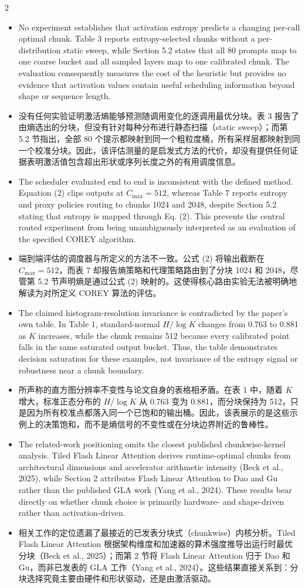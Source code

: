 \documentclass[10pt,a4paper]{article}
\newcommand{\Pair}[2]{#1\par\switchcolumn #2\par\switchcolumn*}
\newcommand{\PItem}[3]{\Pair{\begin{itemize}[label={#1}]\item #2\end{itemize}}%
                            {\begin{itemize}[label={#1}]\item #3\end{itemize}}}
\begin{document}
\begin{paracol}{2}
\PItem{\textbullet}{No experiment establishes that activation entropy predicts a
changing per-call optimal chunk. Table 3 reports entropy-selected chunks without a
per-distribution static sweep, while Section 5.2 states that all 80 prompts map to
one coarse bucket and all sampled layers map to one calibrated chunk. The evaluation
consequently measures the cost of the heuristic but provides no evidence that
activation values contain useful scheduling information beyond shape or sequence
length.}
{没有任何实验证明激活熵能够预测随调用变化的逐调用最优分块。表 3 报告了由熵选出的分块，但没有针对每种分布进行静态扫描（static sweep）；而第 5.2 节指出，全部 80 个提示都映射到同一个粗粒度桶，所有采样层都映射到同一个校准分块。因此，该评估测量的是启发式方法的代价，却没有提供任何证据表明激活值包含超出形状或序列长度之外的有用调度信息。}

\PItem{\textbullet}{The scheduler evaluated end to end is inconsistent with the
defined method. Equation (2) clips outputs at $C_{\max}=512$, whereas Table 7
reports entropy and proxy policies routing to chunks 1024 and 2048, despite Section
5.2 stating that entropy is mapped through Eq. (2). This prevents the central routed
experiment from being unambiguously interpreted as an evaluation of the specified
COREY algorithm.}
{端到端评估的调度器与所定义的方法不一致。公式 (2) 将输出截断在 $C_{\max}=512$，而表 7 却报告熵策略和代理策略路由到了分块 1024 和 2048，尽管第 5.2 节声明熵是通过公式 (2) 映射的。这使得核心路由实验无法被明确地解读为对所定义 COREY 算法的评估。}

\PItem{\textbullet}{The claimed histogram-resolution invariance is contradicted by
the paper's own table. In Table 1, standard-normal $H/\log K$ changes from 0.763 to
0.881 as $K$ increases, while the chunk remains 512 because every calibrated point
falls in the same saturated output bucket. Thus, the table demonstrates decision
saturation for these examples, not invariance of the entropy signal or robustness
near a chunk boundary.}
{所声称的直方图分辨率不变性与论文自身的表格相矛盾。在表 1 中，随着 $K$ 增大，标准正态分布的 $H/\log K$ 从 0.763 变为 0.881，而分块保持为 512，只是因为所有校准点都落入同一个已饱和的输出桶。因此，该表展示的是这些示例上的决策饱和，而不是熵信号的不变性或在分块边界附近的鲁棒性。}

\PItem{\textbullet}{The related-work positioning omits the closest published
chunkwise-kernel analysis. Tiled Flash Linear Attention derives runtime-optimal
chunks from architectural dimensions and accelerator arithmetic intensity (Beck et
al., 2025), while Section 2 attributes Flash Linear Attention to Dao and Gu rather
than the published GLA work (Yang et al., 2024). These results bear directly on
whether chunk choice is primarily hardware- and shape-driven rather than
activation-driven.}
{相关工作的定位遗漏了最接近的已发表分块式（chunkwise）内核分析。Tiled Flash Linear Attention 根据架构维度和加速器的算术强度推导出运行时最优分块（Beck et al., 2025）；而第 2 节将 Flash Linear Attention 归于 Dao 和 Gu，而非已发表的 GLA 工作（Yang et al., 2024）。这些结果直接关系到：分块选择究竟主要由硬件和形状驱动，还是由激活驱动。}


\end{paracol}
\end{document}
